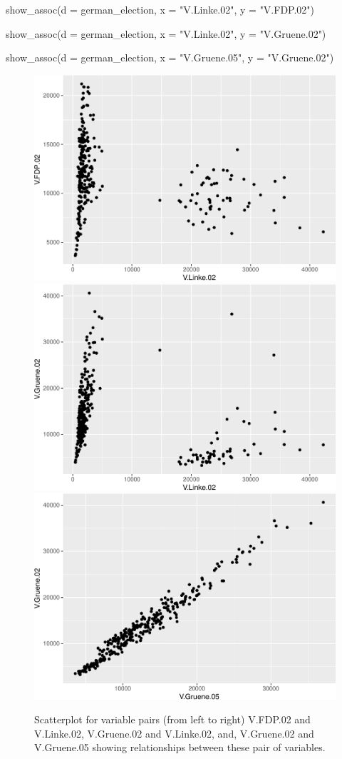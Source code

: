 \begin{Schunk}
\begin{Sinput}
show_assoc(d = german_election,
           x = "V.Linke.02",
           y = "V.FDP.02")

show_assoc(d = german_election,
           x = "V.Linke.02",
           y = "V.Gruene.02")

show_assoc(d = german_election,
           x = "V.Gruene.05",
           y = "V.Gruene.02")
\end{Sinput}
\begin{figure}
\includegraphics[width=0.5\linewidth]{rj_paper_files/figure-latex/int-pairs-multiple-germanelection-1} \includegraphics[width=0.5\linewidth]{rj_paper_files/figure-latex/int-pairs-multiple-germanelection-2} \includegraphics[width=0.5\linewidth]{rj_paper_files/figure-latex/int-pairs-multiple-germanelection-3} \caption[Scatterplot for variable pairs (from left to right) V.FDP.02 and V.Linke.02, V.Gruene.02  and V.Linke.02, and,  V.Gruene.02 and V.Gruene.05 showing relationships between these pair of variables]{Scatterplot for variable pairs (from left to right) V.FDP.02 and V.Linke.02, V.Gruene.02  and V.Linke.02, and,  V.Gruene.02 and V.Gruene.05 showing relationships between these pair of variables.}\label{fig:int-pairs-multiple-germanelection}
\end{figure}
\end{Schunk}

